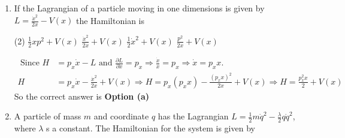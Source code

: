 \begin{enumerate}
	 \begin{tasks}(4)
		\task[\textbf{a.}]$x \ddot{x}-y \ddot{y}$
		\task[\textbf{b.}]$x \ddot{y}-y \ddot{x}$
		\task[\textbf{c.}]$x \dot{y}-y \dot{x}$
		\task[\textbf{d.}] $y \dot{x}^{2}+x \dot{y}^{2}$
	\end{tasks}
	\begin{answer}
		$$
		\begin{aligned}
		&L(x, y, \dot{x}, \dot{y})\\
		&L^{\prime}=L(x, y, \dot{x}, \dot{y})+x \ddot{y}-y \ddot{x}\\
		&\frac{d^{\prime}}{d t^{\prime}}\left(\frac{\partial L^{\prime}}{\partial \dot{x}}\right)-\frac{\partial L^{\prime}}{\partial x}=\frac{d}{d t}\left(\frac{\partial L}{\partial \dot{x}}\right)-\frac{\partial L}{\partial x}+\ddot{y}=0=0+\ddot{y}=0 \Rightarrow \dot{y}=c_{1}\\
		&\frac{d}{d t}\left(\frac{\partial L}{\partial y}\right)-\frac{\partial L^{\prime}}{\partial y}=\frac{d}{d t}\left(\frac{\partial L}{\partial \dot{y}}\right)-\frac{\partial L}{\partial y}+\ddot{x}=0=0-\ddot{x}=0 \Rightarrow \dot{x}=c_{2}
	\end{aligned}
	$$
	So the correct answer is \textbf{Option (b)}
	\end{answer}
\item If the Lagrangian of a particle moving in one dimensions is given by $L=\frac{\dot{x}^{2}}{2 x}-V(x)$ the Hamiltonian is

 \begin{tasks}(2)
	\task[\textbf{a.}]$\frac{1}{2} x p^{2}+V(x)$
	\task[\textbf{b.}] $\frac{\dot{x}^{2}}{2 x}+V(x)$
	\task[\textbf{c.}]$\frac{1}{2} \dot{x}^{2}+V(x)$
	\task[\textbf{d.}] $\frac{p^{2}}{2 x}+V(x)$
\end{tasks}
\begin{answer}
	$$
	\begin{aligned}
	\text { Since } H&=p_{x} \dot{x}-L \text { and } \frac{\partial L}{\partial \dot{x}}=p_{x} \Rightarrow \frac{\dot{x}}{x}=p_{x} \Rightarrow \dot{x}=p_{x} x \text {. }\\
	H&=p_{x} \dot{x}-\frac{\dot{x}^{2}}{2 x}+V(x) \Rightarrow H=p_{x}\left(p_{x} x\right)-\frac{\left(p_{x} x\right)^{2}}{2 x}+V(x) \Rightarrow H=\frac{p_{x}^{2} x}{2}+V(x)
\end{aligned}
$$
	So the correct answer is \textbf{Option (a)}
\end{answer}
\item A particle of mass $m$ and coordinate $q$ has the Lagrangian $L=\frac{1}{2} m \dot{q}^{2}-\frac{\lambda}{2} q \dot{q}^{2}$, where $\lambda$ s a constant. The Hamiltonian for the system is given by 


\end{enumerate}
